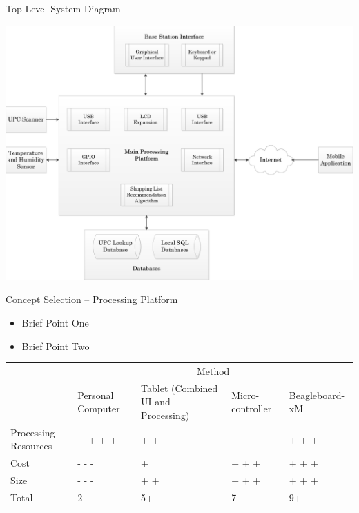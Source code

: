 \documentclass[t]{beamer}
\begin{document}
\begin{frame}{Top Level System Diagram}
\begin{center}
\includegraphics[scale=.3]{../Graphics/FullSystemDiagram}
\end{center}
\end{frame}

\begin{frame}{Concept Selection -- Processing Platform}
\begin{itemize}
\item Brief Point One
\item Brief Point Two
\end{itemize}
\vspace{.5cm}
\footnotesize
\begin{tabular}{| p{.7in} | p{.7in} | p{1in} | p{0.7in} | p{.8in} | }
\cline{2-5}
\multicolumn{1}{c}{}&\multicolumn{4}{|c|}{Method} \\
\cline{2-5}
\multicolumn{1}{c|}{}&Personal \newline Computer&Tablet (Combined UI and Processing)&Micro-controller & Beagleboard-xM\\
\hline
Processing Resources&+ + + +&+ +&+&+ + +\\
\hline
Cost &- - -& + &+ + +&+ + +\\
\hline
Size&- - -&+ +&+ + +& + + +\\
\hline
\hline
Total &2-&5+&7+& 9+\\
\hline
\end{tabular}
\end{frame}
\end{document}
